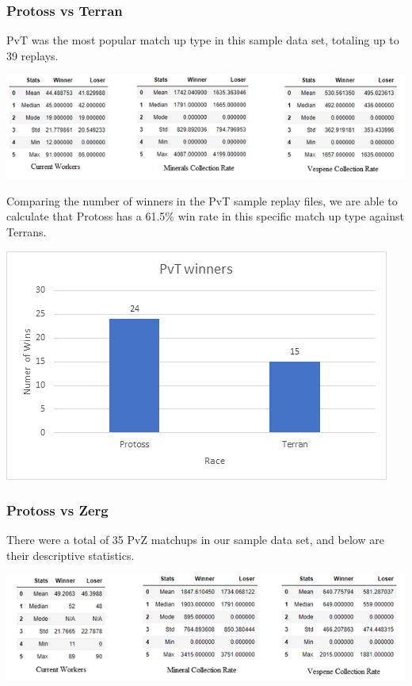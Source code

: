 \documentclass[a4paper,12pt]{report}
\begin{document}
\subsubsection{Protoss vs Terran}
PvT was the most popular match up type in this sample data set, totaling up to 39 replays.

\begin{center}
    \captionsetup{type=figure}
    \includegraphics[width=.9\linewidth]{media/TerranWinnervsLoser.png}
\end{center}

Comparing the number of winners in the PvT sample replay files, we are able to calculate that Protoss has a 61.5\% win rate in this specific match up type against Terrans.

\begin{center}
    \captionsetup{type=figure}
    \includegraphics[width=.9\linewidth]{media/PvTwinrate.png}
\end{center}

\subsubsection{Protoss vs Zerg}
There were a total of 35 PvZ matchups in our sample data set, and below are their descriptive statistics. 

\begin{center}
    \captionsetup{type=figure}
    \includegraphics[width=.9\linewidth]{media/workersCollectionPvZ.png}
\end{center}
\end{document}

